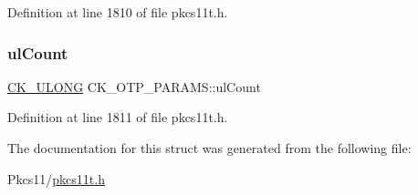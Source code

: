 Definition at line 1810 of file pkcs11t.\+h.

\mbox{\label{struct_c_k___o_t_p___p_a_r_a_m_s_add62565e22aa0a71327114091fbaa2d4}} 
\subsubsection{\texorpdfstring{ul\+Count}{ulCount}}
{\footnotesize\ttfamily \hyperlink{pkcs11t_8h_a35181858a3b7a0a81f49d180d8f446ef}{C\+K\+\_\+\+U\+L\+O\+NG} C\+K\+\_\+\+O\+T\+P\+\_\+\+P\+A\+R\+A\+M\+S\+::ul\+Count}



Definition at line 1811 of file pkcs11t.\+h.



The documentation for this struct was generated from the following file\+:\begin{DoxyCompactItemize}
\item 
Pkcs11/\hyperlink{pkcs11t_8h}{pkcs11t.\+h}\end{DoxyCompactItemize}
